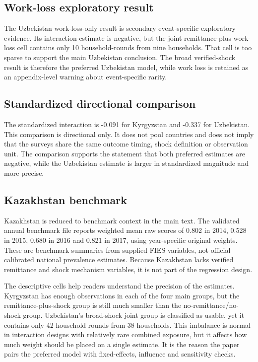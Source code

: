 \documentclass[11pt]{article}
\begin{document}
\subsection{Work-loss exploratory result}

The Uzbekistan work-loss-only result is secondary event-specific exploratory evidence. Its interaction estimate is negative, but the joint remittance-plus-work-loss cell contains only 10 household-rounds from nine households. That cell is too sparse to support the main Uzbekistan conclusion. The broad verified-shock result is therefore the preferred Uzbekistan model, while work loss is retained as an appendix-level warning about event-specific rarity.

\subsection{Standardized directional comparison}

The standardized interaction is -0.091 for Kyrgyzstan and -0.337 for Uzbekistan. This comparison is directional only. It does not pool countries and does not imply that the surveys share the same outcome timing, shock definition or observation unit. The comparison supports the statement that both preferred estimates are negative, while the Uzbekistan estimate is larger in standardized magnitude and more precise.

\subsection{Kazakhstan benchmark}

Kazakhstan is reduced to benchmark context in the main text. The validated annual benchmark file reports weighted mean raw scores of 0.802 in 2014, 0.528 in 2015, 0.680 in 2016 and 0.821 in 2017, using year-specific original weights. These are benchmark summaries from supplied FIES variables, not official calibrated national prevalence estimates. Because Kazakhstan lacks verified remittance and shock mechanism variables, it is not part of the regression design.

The descriptive cells help readers understand the precision of the estimates. Kyrgyzstan has enough observations in each of the four main groups, but the remittance-plus-shock group is still much smaller than the no-remittance/no-shock group. Uzbekistan's broad-shock joint group is classified as usable, yet it contains only 42 household-rounds from 38 households. This imbalance is normal in interaction designs with relatively rare combined exposure, but it affects how much weight should be placed on a single estimate. It is the reason the paper pairs the preferred model with fixed-effects, influence and sensitivity checks.
\end{document}
